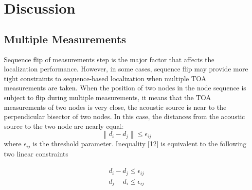\section{Discussion}

\subsection{Multiple Measurements}
 Sequence flip of measurements step is the major factor that affects the localization performance.
 However, in some cases, sequence flip may provide more tight constraints to sequence-based localization when multiple TOA measurements are taken. 
 When the position of two nodes in the node sequence is subject to flip during multiple measurements, 
 it means that the TOA measurements of two nodes is very close,  the acoustic source is near to the perpendicular bisector of two nodes.
In this case, the distances from the acoustic source to the two node are nearly equal:
   \begin{equation} \label{12}
 \left\| {d_i - d_j } \right\| \le \epsilon_{ij}
  \end{equation}
 where $\epsilon_{ij}$ is the threshold parameter. Inequality \eqref{12} is equivalent to the following two linear constraints

 \begin{eqnarray} \label{13}
 \begin{array}{l}
 d_i - d_j \le \epsilon_{ij}  \\
 d_j - d_i \le \epsilon_{ij}  \\
  \end{array}
 \end{eqnarray}







